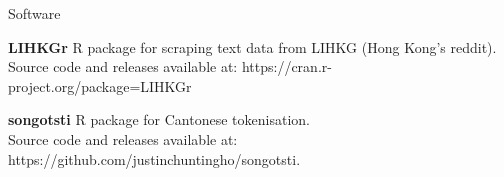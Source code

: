 \documentclass{resume} %
\begin{document}

\begin{rSection}{Software}

{\bf LIHKGr}{}
R package for scraping text data from LIHKG (Hong Kong's reddit). \\ Source code and releases available at: https://cran.r-project.org/package=LIHKGr

{\bf songotsti}{}
R package for Cantonese tokenisation. \\ Source code and releases available at: https://github.com/justinchuntingho/songotsti.

\end{rSection}



\end{document}
